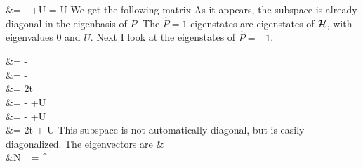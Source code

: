 \documentclass[12pt]{article}
\begin{document}
&= -\cc{\ket{\downarrow,\uparrow}-\ket{\uparrow,\downarrow}+\ket{\uparrow,\downarrow}-\ket{\downarrow,\uparrow}} +U = U
\eeq
We get the following matrix
\beq
{}
\eeq
As it appears, the subspace is already diagonal in the eigenbasis of \(\hat{P}\). The \(\hat{P} = 1\) eigenstates are eigenstates of \(\mathcal{H}\), with eigenvalues 0 and \(U\). Next I look at the eigenstates of \(\hat{P}=-1\).

\beq
\ham\: &= -  \\
&= - \\
&= 2t \\
\ham\: &= -  +U \\
&= -\cc{\ket{\downarrow,\uparrow}-\ket{\uparrow,\downarrow}-\ket{\uparrow,\downarrow}+\ket{\downarrow,\uparrow}} +U \\
&= 2t + U
\eeq
\beq
{}
\eeq
This subspace is not automatically diagonal, but is easily diagonalized. The eigenvectors are 
\beq
& \\
&N_{\pm} = ^
\eeq
\end{document}
